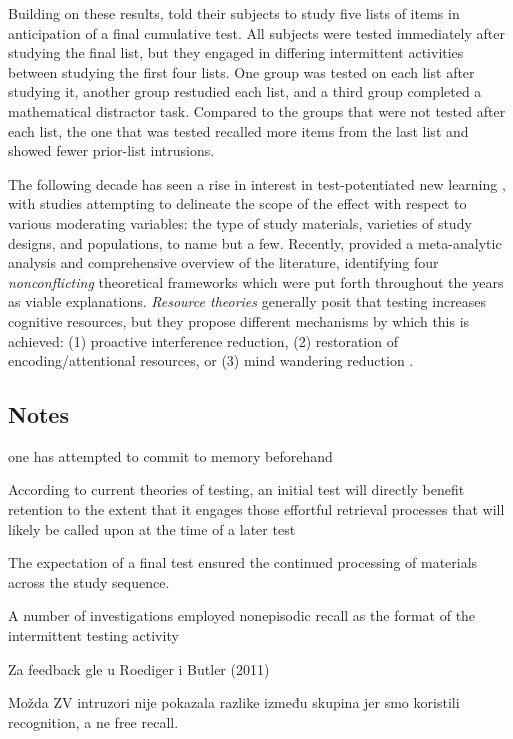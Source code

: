 \documentclass[../main.tex]{subfiles}
\begin{document}
Building on these results, \cite{szpunarTestingStudyInsulates2008} told their subjects to study five lists of items in anticipation of a final cumulative test. All subjects were tested immediately after studying the final list, but they engaged in differing intermittent activities between studying the first four lists. One group was tested on each list after studying it, another group restudied each list, and a third group completed a mathematical distractor task. Compared to the groups that were not tested after each list, the one that was tested recalled more items from the last list and showed fewer prior-list intrusions.

The following decade has seen a rise in interest in test-potentiated new learning \citep{chanRetrievalPotentiatesNew2018, pastotterRetrievalPracticeEnhances2014, yangEnhancingLearningRetrieval2018}, with studies attempting to delineate the scope of the effect with respect to various moderating variables: the type of study materials, varieties of study designs, and populations, to name but a few. Recently, \cite{chanRetrievalPotentiatesNew2018} provided a meta-analytic analysis and comprehensive overview of the literature, identifying four \textit{nonconflicting} theoretical frameworks which were put forth throughout the years as viable explanations. \textit{Resource theories} generally posit that testing increases cognitive resources, but they propose different mechanisms by which this is achieved: (1) proactive interference reduction, (2) restoration of encoding/attentional resources, or (3) mind wandering reduction \cite{pastotterRetrievalLearningFacilitates2011, }.


{
    \biblio
}

\subsection{Notes}
one has attempted to commit to memory beforehand

According to current theories of testing, an initial test will directly benefit retention to the extent that it engages those effortful retrieval processes that will likely be called upon at the time of a later test \cite{roedigeriiiPowerTestingMemory2006}

The expectation of a final test ensured the
continued processing of materials across the study sequence.


A number of investigations employed nonepisodic recall as the format of the intermittent testing activity \cite{divisRetrievalSpeedsContext2014, pastotterRetrievalLearningFacilitates2011, }

Za feedback gle u Roediger i Butler (2011)


Možda ZV intruzori nije pokazala razlike između skupina jer smo koristili recognition, a ne free recall.
\end{document}

